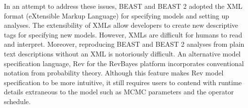 \documentclass[10pt,letterpaper,table]{article}
\begin{document}
In an attempt to address these issues, BEAST \cite{beast} and
BEAST 2 \cite{beast2} adopted the XML format (eXtensible
Markup Language) for specifying models and setting up analyses.
The extensibility of XMLs allow developers to create new
descriptive tags for specifying new models.
However, XMLs are difficult for humans to read and interpret.  
Moreover, reproducing BEAST and BEAST 2 analyses from plain text descriptions without an XML is notoriously difficult. 
An alternative model specification language, Rev for the RevBayes platform
\cite{revbayes} 
incorporates conventional notation from probability theory. 
Although this feature makes Rev model specification to be more intuitive, it still requires users to contend with runtime 
details extraneous to the model such as MCMC parameters and the operator schedule.
\end{document}

